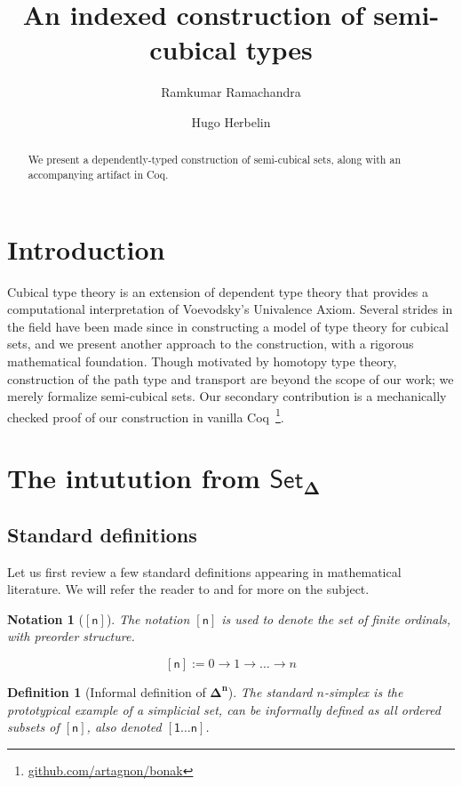 \documentclass[10pt, titlepage]{amsart}
\title{An indexed construction of semi-cubical types}
\author{Ramkumar Ramachandra}
\author{Hugo Herbelin}
\newtheorem{notation}{Notation}
\newtheorem{definition}{Definition}
\newcommand{\Simplex}[1]{\ensuremath{\boldsymbol{\Delta^{#1}}}}
\newcommand{\SSet}{\ensuremath{\mathsf{Set}_{\boldsymbol{\Delta}}}}
\newcommand{\sq}[1]{\ensuremath{\mathsf{[#1]}}}
\newcommand{\sqsn}{\ensuremath{\mathsf{[1 \ldots n]}}}
\begin{document}
\begin{abstract}
  We present a dependently-typed construction of semi-cubical sets, along with an accompanying artifact in Coq.
\end{abstract}
\maketitle
\tableofcontents

\section{Introduction}

Cubical type theory is an extension of dependent type theory that provides a computational interpretation of Voevodsky's Univalence Axiom. Several strides in the field have been made since \cite{Bezem14} in constructing a model of type theory for cubical sets, and we present another approach to the construction, with a rigorous mathematical foundation. Though motivated by homotopy type theory, construction of the path type and transport are beyond the scope of our work; we merely formalize semi-cubical sets. Our secondary contribution is a mechanically checked proof of our construction in vanilla Coq~\footnote{\href{https://github.com/artagnon/bonak}{github.com/artagnon/bonak}}.

\section{The intutution from \texorpdfstring{\SSet}{simplicial sets}}
\subsection{Standard definitions}

Let us first review a few standard definitions appearing in mathematical literature. We will refer the reader to \cite{Friedman08} and \cite{Riehl11} for more on the subject.

\begin{notation}[\sq{n}]
  The notation \sq{n} is used to denote the set of finite ordinals, with preorder structure.

  \begin{equation*}
    \sq{n} := 0 \rightarrow 1 \rightarrow \ldots \rightarrow n
  \end{equation*}
\end{notation}

\begin{definition}[Informal definition of \Simplex{n}]
  The standard $n$-simplex is the prototypical example of a simplicial set,  can be informally defined as all ordered subsets of \sq{n}, also denoted \sqsn.
\end{definition}
\end{document}
